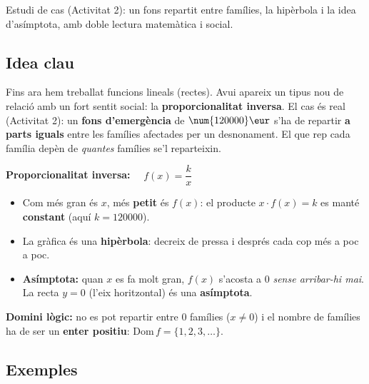 %
{Estudi de cas (Activitat 2): un fons repartit entre famílies, la hipèrbola i la idea d'asímptota, amb doble lectura matemàtica i social.}

\subsection{Idea clau}

Fins ara hem treballat funcions lineals (rectes). Avui apareix un tipus nou de
relació amb un fort sentit social: la \textbf{proporcionalitat inversa}. El cas és
real (Activitat 2): un \textbf{fons d'emergència} de $\num{120000}\eur$ s'ha de
repartir \textbf{a parts iguals} entre les famílies afectades per un desnonament. El
que rep cada família depèn de \emph{quantes} famílies se'l reparteixin.

\begin{idea}
\textbf{Proporcionalitat inversa:} $\quad f(x)=\dfrac{k}{x}$
\begin{itemize}[leftmargin=1.4em, itemsep=2pt]
  \item Com més gran és $x$, més \textbf{petit} és $f(x)$: el producte
        $x\cdot f(x)=k$ es manté \textbf{constant} (aquí $k=\num{120000}$).
  \item La gràfica és una \textbf{hipèrbola}: decreix de pressa i després cada cop
        més a poc a poc.
  \item \textbf{Asímptota:} quan $x$ es fa molt gran, $f(x)$ s'acosta a $0$ \emph{sense
        arribar-hi mai}. La recta $y=0$ (l'eix horitzontal) és una \textbf{asímptota}.
\end{itemize}
\textbf{Domini lògic:} no es pot repartir entre $0$ famílies ($x\neq 0$) i el nombre
de famílies ha de ser un \textbf{enter positiu}: $\mathrm{Dom}\,f=\{1,2,3,\dots\}$.
\end{idea}

\subsection{Exemples}

